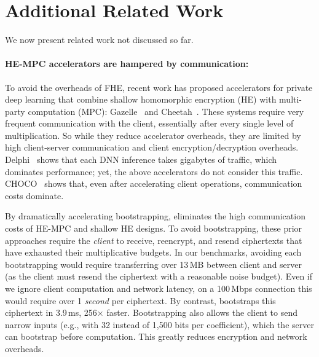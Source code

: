 \section{Additional Related Work}\label{sec:related}

We now present related work not discussed so far.

\paragraph{HE-MPC accelerators are hampered by communication:}
To avoid the overheads of FHE, recent work has proposed accelerators
for private deep learning
that combine shallow homomorphic encryption (HE) with multi-party computation (MPC):
Gazelle~\cite{juvekar2018gazelle} and Cheetah~\cite{reagen:hpca21:cheetah}.
These systems require very frequent communication with the client,
essentially after every single level of multiplication.
So while they reduce accelerator overheads, they are limited by high client-server communication
and client encryption/decryption overheads.
Delphi~\cite{mishra2020delphi} shows that each DNN inference takes gigabytes of traffic,
which dominates performance; yet, the above accelerators do not consider this traffic.
CHOCO~\cite{vanderhagen:arxiv21:choco} shows that, even after accelerating client operations,
communication costs dominate.

By dramatically accelerating bootstrapping, \name eliminates the high communication costs of HE-MPC and shallow HE designs.
To avoid bootstrapping, these prior approaches require the \emph{client} to receive, reencrypt, and resend ciphertexts that have exhausted their multiplicative budgets.
In our benchmarks, avoiding each bootstrapping would require transferring over 13\,MB between client and server
(as the client must resend the ciphertext with a reasonable noise budget).
Even if we ignore client computation and network latency, on a 100\,Mbps connection this would
require over 1 \emph{second} per ciphertext.
By contrast, \name bootstraps this ciphertext in 3.9\,ms, 256$\times$ faster.
Bootstrapping also allows the client to send narrow inputs (e.g., with 32 instead of 1,500 bits per coefficient),
which the server can bootstrap before computation.
This greatly reduces encryption and network overheads.

